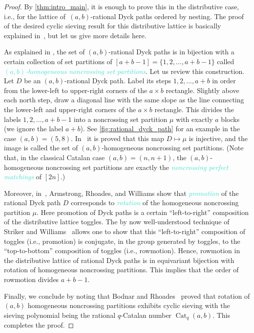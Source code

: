 \documentclass[11pt]{amsart}
\DeclareMathOperator{\cat}{Cat}
\newcommand{\dfn}[1]{\textcolor{Turquoise}{\emph{#1}}}
\theoremstyle{definition}
\begin{document}
\begin{proof}
By \cref{thm:intro_main}, it is enough to prove this in the distributive case, i.e., for the lattice of~$(a,b)$-rational Dyck paths ordered by nesting. The proof of the desired cyclic sieving result for this distributive lattice is basically explained in~\cite[\S7.5]{thomas2019rowmotion}, but let us give more details here.

As explained in \cite[\S5.1]{armstrong2013rational}, the set of $(a,b)$-rational Dyck paths is in bijection with a certain collection of set partitions of $[a+b-1]=\{1,2,\ldots,a+b-1\}$ called \dfn{$(a,b)$-homogeneous noncrossing set partitions}. Let us review this construction. Let $D$ be an $(a,b)$-rational Dyck path. Label its steps $1,2,\ldots,a+b$ in order from the lower-left to upper-right corners of the $a\times b$ rectangle. Slightly above each north step, draw a diagonal line with the same slope as the line connecting the lower-left and upper-right corners of the $a\times b$ rectangle. This divides the labels $1,2,\ldots,a+b-1$ into a noncrossing set partition $\mu$ with exactly $a$ blocks (we ignore the label $a+b$). See \cref{fig:rational_dyck_path} for an example in the case $(a,b)=(5,8)$. In~\cite[\S5.1]{armstrong2013rational} it is proved that this map $D\mapsto \mu$ is injective, and the image is called the set of $(a,b)$-homogeneous noncrossing set partitions. (Note that, in the classical Catalan case $(a,b)=(n,n+1)$, the $(a,b)$-homogeneous noncrossing set partitions are exactly the \dfn{noncrossing perfect matchings} of $[2n]$.)

Moreover, in~\cite[\S5.2]{armstrong2013rational}, Armstrong, Rhoades, and Williams show that \dfn{promotion} of the rational Dyck path $D$ corresponds to \dfn{rotation} of the homogeneous noncrossing partition $\mu$. Here promotion of Dyck paths is a certain ``left-to-right'' composition of the distributive lattice toggles. The by now well-understood technique of Striker and Williams~\cite{striker2012rowmotion} allows one to show that this ``left-to-right'' composition of toggles (i.e., promotion) is conjugate, in the group generated by toggles, to the ``top-to-bottom'' composition of toggles (i.e., rowmotion). Hence, rowmotion in the distributive lattice of rational Dyck paths is in equivariant bijection with rotation of homogeneous noncrossing partitions. This implies that the order of rowmotion divides $a+b-1$.

Finally, we conclude by noting that Bodnar and Rhoades~\cite[Theorem 5.4]{bodnar2016rational} proved that rotation of $(a,b)$ homogeneous noncrossing partitions exhibits cyclic sieving with the sieving polynomial being the rational $q$-Catalan number $\cat_q(a,b)$. This completes the proof.
\end{proof}
\end{document}
